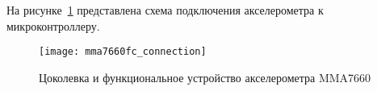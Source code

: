 \documentclass[document.tex]{subfiles}
\begin{document}
На рисунке~\ref{fig:mma7660fc_connection} представлена схема подключения акселерометра к микроконтроллеру.

\begin{figure}[here]
\centering
\texttt{[image: mma7660fc\_connection]}
\caption{Цоколевка и функциональное устройство акселерометра MMA7660}
\label{fig:mma7660fc_connection}
\end{figure}
\end{document}
